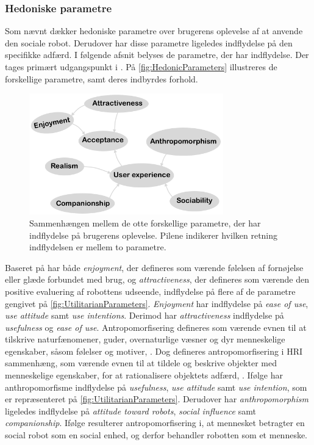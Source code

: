 \subsubsection*{Hedoniske parametre}
\label{InteraktionSocialeRobotterParametreHedonic}
%
Som nævnt dækker hedoniske parametre over brugerens oplevelse af at anvende den sociale robot. Derudover har disse parametre ligeledes indflydelse på den specifikke adfærd. I følgende afsnit belyses de parametre, der har indflydelse. Der tages primært udgangspunkt i \textcite[ss. 1477-1478]{PDF:SharingALifeHarvey}. På \autoref{fig:HedonicParameters} illustreres de forskellige parametre, samt deres indbyrdes forhold.
%
\begin{figure}[H]
\centering
\includegraphics[width = 0.75\textwidth]{Figure/Introduktion/HedonicParameters} 
\caption{Sammenhængen mellem de otte forskellige parametre, der har indflydelse på brugerens oplevelse. Pilene indikerer hvilken retning indflydelsen er mellem to parametre.}
\label{fig:HedonicParameters}
\end{figure}
\noindent 
%
Baseret på \textcite[s. 1477]{PDF:ExploringInfluencingVariable} har både \textit{enjoyment}, der defineres som værende følelsen af fornøjelse eller glæde forbundet med brug, og \textit{attractiveness}, der defineres som værende den positive evaluering af robottens udseende, indflydelse på flere af de parametre gengivet på \autoref{fig:UtilitarianParameters}. \textit{Enjoyment} har indflydelse på \textit{ease of use}, \textit{use attitude} samt \textit{use intentions}. Derimod har \textit{attractiveness} indflydelse på \textit{usefulness} og \textit{ease of use}. \blankline 
%
Antropomorfisering defineres som værende evnen til at tilskrive naturfænomener, guder, overnaturlige væsner og dyr menneskelige egenskaber, såsom følelser og motiver, \parencite{WEB:DefAntropomorisering}. Dog defineres antropomorfisering i HRI sammenhæng, som værende evnen til at tildele og beskrive objekter med menneskelige egenskaber, for at rationalisere objektets adfærd, \parencite[s. 1478]{PDF:ExploringInfluencingVariable}. Ifølge \textcite[s. 1478]{PDF:ExploringInfluencingVariable} har anthropomorfisme indflydelse på \textit{usefulness}, \textit{use attitude} samt \textit{use intention}, som er repræsenteret på \autoref{fig:UtilitarianParameters}. Derudover har \textit{anthropomorphism} ligeledes indflydelse på \textit{attitude toward robots}, \textit{social influence} samt \textit{companionship}. Ifølge \textcite[s. 19]{PDF:CloseButNotStuck} resulterer antropomorfisering i, at mennesket betragter en social robot som en social enhed, og derfor behandler robotten som et menneske.

